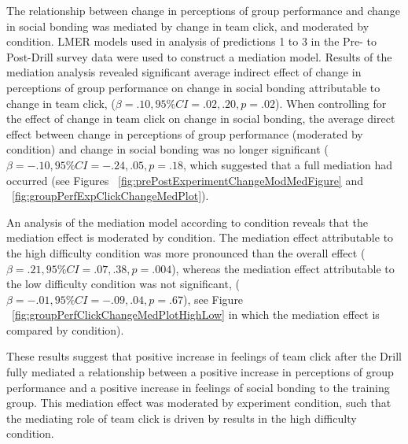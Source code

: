 
The relationship between change in perceptions of group performance and change in social bonding was mediated by change in team click, and moderated by condition.  LMER models used in analysis of predictions 1 to 3 in the Pre- to Post-Drill survey data were used to construct a mediation model.  Results of the mediation analysis revealed significant average indirect effect of change in perceptions of group performance on change in social bonding attributable to change in team click, ($\beta = .10, 95\% CI = .02, .20, p = .02$).  When controlling for the effect of change in team click on change in social bonding, the average direct effect between change in perceptions of group performance (moderated by condition) and change in social bonding was no longer significant ($\beta = -.10, 95\% CI = -.24 , .05, p = .18$, which suggested that a full mediation had occurred (see Figures ~\ref{fig:prePostExperimentChangeModMedFigure} and ~\ref{fig:groupPerfExpClickChangeMedPlot}).


An analysis of the mediation model according to condition reveals that the mediation effect is moderated by condition.  The mediation effect attributable to the high difficulty condition was more pronounced than the overall effect ($\beta = .21, 95\% CI = .07 , .38, p = .004$), whereas the mediation effect attributable to the low difficulty condition was not significant, ($\beta = -.01, 95\% CI = -.09 , .04, p = .67$), see Figure ~\ref{fig:groupPerfClickChangeMedPlotHighLow} in which the mediation effect is compared by condition).


These results suggest that positive increase in feelings of team click after the Drill fully mediated a relationship between a positive increase in perceptions of group performance and a positive increase in feelings of social bonding to the training group. This mediation effect was moderated by experiment condition, such that the mediating role of team click is driven by results in the high difficulty condition.


